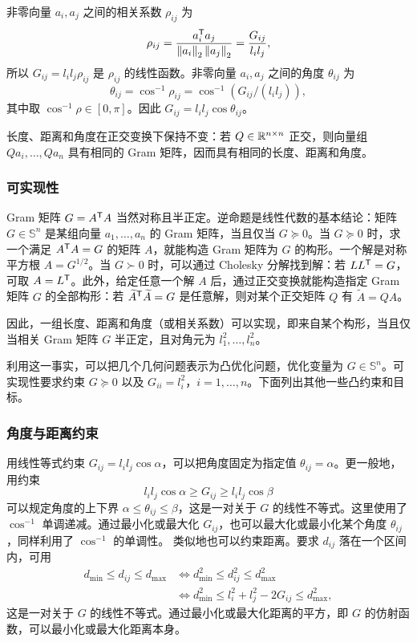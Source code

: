 非零向量 $a_i,a_j$ 之间的相关系数 $\rho_{ij}$ 为
\[\rho_{ij}=\frac{a_i^\mathsf T a_j}{\left\lVert a_i\right\rVert_2\left\lVert a_j\right\rVert_2}=\frac{G_{ij}}{l_il_j},\]
所以 $G_{ij}=l_il_j\rho_{ij}$ 是 $\rho_{ij}$ 的线性函数。非零向量 $a_i,a_j$ 之间的角度 $\theta_{ij}$ 为
\[\theta_{ij}=\cos^{-1}\rho_{ij}=\cos^{-1}(G_{ij}/(l_il_j)),\]
其中取 $\cos^{-1}\rho\in[0,\pi]$。因此 $G_{ij}=l_il_j\cos\theta_{ij}$。

长度、距离和角度在正交变换下保持不变：若 $Q\in\mathbb R^{n\times n}$ 正交，则向量组 $Qa_i,\ldots,Qa_n$ 具有相同的 Gram 矩阵，因而具有相同的长度、距离和角度。
\subsubsection*{可实现性}
Gram 矩阵 $G=A^\mathsf T A$ 当然对称且半正定。逆命题是线性代数的基本结论：矩阵 $G\in\mathbb S^n$ 是某组向量 $a_1,\ldots,a_n$ 的 Gram 矩阵，当且仅当 $G\succeq0$。当 $G\succeq0$ 时，求一个满足 $A^\mathsf T A=G$ 的矩阵 $A$，就能构造 Gram 矩阵为 $G$ 的构形。一个解是对称平方根 $A=G^{1/2}$。当 $G\succ0$ 时，可以通过 Cholesky 分解找到解：若 $LL^\mathsf T=G$，可取 $A=L^\mathsf T$。此外，给定任意一个解 $A$ 后，通过正交变换就能构造指定 Gram 矩阵 $G$ 的全部构形：若 $\widetilde A^\mathsf T\widetilde A=G$ 是任意解，则对某个正交矩阵 $Q$ 有 $\widetilde A=QA$。

因此，一组长度、距离和角度（或相关系数）可以实现，即来自某个构形，当且仅当相关 Gram 矩阵 $G$ 半正定，且对角元为 $l_1^2,\ldots,l_n^2$。

利用这一事实，可以把几个几何问题表示为凸优化问题，优化变量为 $G\in\mathbb S^n$。可实现性要求约束 $G\succeq0$ 以及 $G_{ii}=l_i^2$，$i=1,\ldots,n$。下面列出其他一些凸约束和目标。
\subsubsection*{角度与距离约束}
用线性等式约束 $G_{ij}=l_il_j\cos\alpha$，可以把角度固定为指定值 $\theta_{ij}=\alpha$。更一般地，用约束
\[l_il_j\cos\alpha\geq G_{ij}\geq l_il_j\cos\beta\]
可以规定角度的上下界 $\alpha\leq\theta_{ij}\leq\beta$，这是一对关于 $G$ 的线性不等式。这里使用了 $\cos^{-1}$ 单调递减。通过最小化或最大化 $G_{ij}$，也可以最大化或最小化某个角度 $\theta_{ij}$，同样利用了 $\cos^{-1}$ 的单调性。
类似地也可以约束距离。要求 $d_{ij}$ 落在一个区间内，可用
\[\begin{aligned}
 d_{\min}\leq d_{ij}\leq d_{\max}
 &\Longleftrightarrow d_{\min}^2\leq d_{ij}^2\leq d_{\max}^2\\
 &\Longleftrightarrow d_{\min}^2\leq l_i^2+l_j^2-2G_{ij}\leq d_{\max}^2,
\end{aligned}\]
这是一对关于 $G$ 的线性不等式。通过最小化或最大化距离的平方，即 $G$ 的仿射函数，可以最小化或最大化距离本身。

